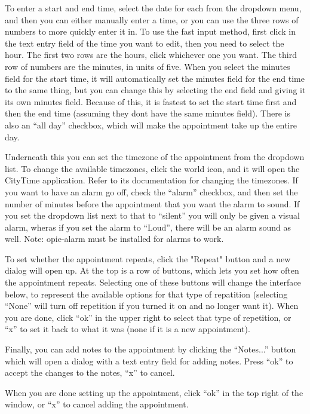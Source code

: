 \documentclass[12pt,letterpaper,oneside, openany]{book} \usepackage[latin1] {inputenc}
\begin{document}
To enter a start and end time, select the date for each from the dropdown menu, and then you can either manually enter a time, or you can use the three rows of numbers to more quickly enter it in. To use the fast input method, first click in the text entry field of the time you want to edit, then you need to select the hour. The first two rows are the hours, click whichever one you want. The third row of numbers are the minutes, in units of five. When you select the minutes field for the start time, it will automatically set the minutes field for the end time to the same thing, but you can change this by selecting the end field and giving it its own minutes field. Because of this, it is fastest to set the start time first and then the end time (assuming they dont have the same minutes field). There is also an ``all day'' checkbox, which will make the appointment take up the entire day. 

Underneath this you can set the timezone of the appointment from the dropdown list. To change the available timezones, click the world icon, and it will open the CityTime application. Refer to its documentation for changing the timezones. If you want to have an alarm go off, check the ``alarm'' checkbox, and then set the number of minutes before the appointment that you want the alarm to sound. If you set the dropdown list next to that to ``silent'' you will only be given a visual alarm, wheras if you set the alarm to ``Loud'', there will be an alarm sound as well. Note: opie-alarm must be installed for alarms to work. 

To set whether the appointment repeats, click the "Repeat" button and a new dialog will open up. At the top is a row of buttons, which lets you set how often the appointment repeats. Selecting one of these buttons will change the interface below, to represent the available options for that type of repatition (selecting ``None'' will turn off repetition if you turned it on and no longer want it). When you are done, click ``ok'' in the upper right to select that type of repetition, or ``x'' to set it back to what it was (none if it is a new appointment). 

Finally, you can add notes to the appointment by clicking the ``Notes...'' button which will open a dialog with a text entry field for adding notes. Press ``ok'' to accept the changes to the notes, ``x'' to cancel. 

When you are done setting up the appointment, click ``ok'' in the top right of the window, or ``x'' to cancel adding the appointment. 
\end{document}

